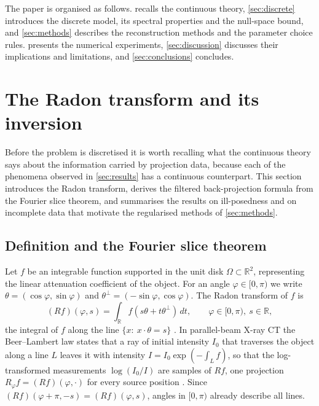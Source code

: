\documentclass[11pt,a4paper]{article}
\numberwithin{equation}{section}
\theoremstyle{remark}
\newcommand{\R}{\mathbb{R}}
\begin{document}
The paper is organised as follows.  recalls the continuous theory, \cref{sec:discrete} introduces the discrete model, its spectral properties and the null-space bound, and \cref{sec:methods} describes the reconstruction methods and the parameter choice rules.  presents the numerical experiments, \cref{sec:discussion} discusses their implications and limitations, and \cref{sec:conclusions} concludes.

\section{The Radon transform and its inversion}\label{sec:radon}

Before the problem is discretised it is worth recalling what the continuous theory says about the information carried by projection data, because each of the phenomena observed in \cref{sec:results} has a continuous counterpart. This section introduces the Radon transform, derives the filtered back-projection formula from the Fourier slice theorem, and summarises the results on ill-posedness and on incomplete data that motivate the regularised methods of \cref{sec:methods}.

\subsection{Definition and the Fourier slice theorem}\label{sec:radon-def}

Let $f$ be an integrable function supported in the unit disk $\Omega\subset\R^2$, representing the linear attenuation coefficient of the object. For an angle $\varphi\in[0,\pi)$ we write $\theta=(\cos\varphi,\sin\varphi)$ and $\theta^\perp=(-\sin\varphi,\cos\varphi)$. The Radon transform of $f$ is
\begin{equation}\label{eq:radon}
  (Rf)(\varphi,s)=\int_{\R} f(s\theta+t\theta^\perp)\,dt,\qquad \varphi\in[0,\pi),\ s\in\R,
\end{equation}
the integral of $f$ along the line $\{x:\ x\cdot\theta=s\}$ \citep{radon1917,natterer2001}. In parallel-beam X-ray CT the Beer--Lambert law states that a ray of initial intensity $I_0$ that traverses the object along a line $L$ leaves it with intensity $I=I_0\exp(-\int_L f)$, so that the log-transformed measurements $\log(I_0/I)$ are samples of $Rf$, one projection $R_\varphi f=(Rf)(\varphi,\cdot)$ for every source position \citep{kak2001,herman2009}. Since $(Rf)(\varphi+\pi,-s)=(Rf)(\varphi,s)$, angles in $[0,\pi)$ already describe all lines.
\end{document}
